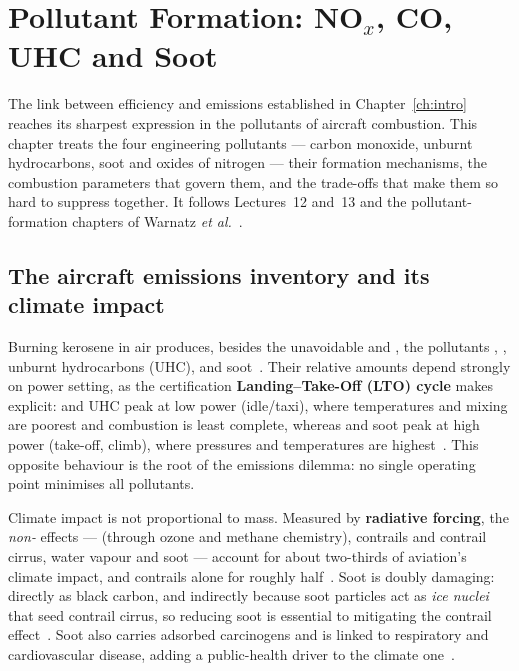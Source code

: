 \chapter{Pollutant Formation: \texorpdfstring{NO$_x$}{NOx}, CO, UHC and Soot}\label{ch:emissions}

The link between efficiency and emissions established in Chapter~\ref{ch:intro} reaches its sharpest expression in the pollutants of aircraft combustion. This chapter treats the four engineering pollutants --- carbon monoxide, unburnt hydrocarbons, soot and oxides of nitrogen --- their formation mechanisms, the combustion parameters that govern them, and the trade-offs that make them so hard to suppress together. It follows Lectures~12 and~13 and the pollutant-formation chapters of Warnatz \emph{et al.}~\cite{lecture12,lecture13,warnatz2006combustion}.

\section{The aircraft emissions inventory and its climate impact}

Burning kerosene in air produces, besides the unavoidable  and , the pollutants , , unburnt hydrocarbons (UHC),  and soot~\cite{lecture12}. Their relative amounts depend strongly on power setting, as the certification \textbf{Landing--Take-Off (LTO) cycle} makes explicit:  and UHC peak at low power (idle/taxi), where temperatures and mixing are poorest and combustion is least complete, whereas  and soot peak at high power (take-off, climb), where pressures and temperatures are highest~\cite{lecture12,lecture13}. This opposite behaviour is the root of the emissions dilemma: no single operating point minimises all pollutants.

Climate impact is not proportional to mass. Measured by \textbf{radiative forcing}, the \emph{non-} effects ---  (through ozone and methane chemistry), contrails and contrail cirrus, water vapour and soot --- account for about two-thirds of aviation's climate impact, and contrails alone for roughly half~\cite{lecture12}. Soot is doubly damaging: directly as black carbon, and indirectly because soot particles act as \emph{ice nuclei} that seed contrail cirrus, so reducing soot is essential to mitigating the contrail effect~\cite{lecture12}. Soot also carries adsorbed carcinogens and is linked to respiratory and cardiovascular disease, adding a public-health driver to the climate one~\cite{lecture12}.

